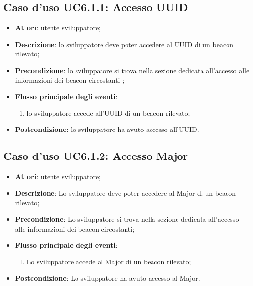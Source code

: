 \documentclass[../AnalisiDeiRequisiti.tex]{subfiles}
\begin{document}
\subsection{Caso d'uso UC6.1.1: Accesso UUID}
\begin{itemize}
	\item \textbf{Attori}: utente sviluppatore;
	\item \textbf{Descrizione}: lo sviluppatore deve poter accedere al UUID di un beacon rilevato; 
	\item \textbf{Precondizione}: lo sviluppatore si trova nella sezione dedicata all'accesso alle informazioni dei beacon circostanti ;
	
	\item \textbf{Flusso principale degli eventi}:
	\begin{enumerate}
		\item lo sviluppatore accede all'UUID di un beacon rilevato;
		
	\end{enumerate}
	\item \textbf{Postcondizione}: lo sviluppatore ha avuto accesso all'UUID.
\end{itemize}
\hypertarget{UC6.1.2}{}
\subsection{Caso d'uso UC6.1.2: Accesso Major}
\begin{itemize}
	\item \textbf{Attori}: utente sviluppatore;
	\item \textbf{Descrizione}: Lo sviluppatore deve poter accedere al Major di un beacon rilevato; 
	\item \textbf{Precondizione}: Lo sviluppatore si trova nella sezione dedicata all'accesso alle informazioni dei beacon circostanti;
	
	\item \textbf{Flusso principale degli eventi}:
	\begin{enumerate}
		\item Lo sviluppatore accede al Major di un beacon rilevato;
		
	\end{enumerate}
	\item \textbf{Postcondizione}: Lo sviluppatore ha avuto accesso al Major.
\end{itemize}
\hypertarget{UC6.1.3}{}
\end{document}
